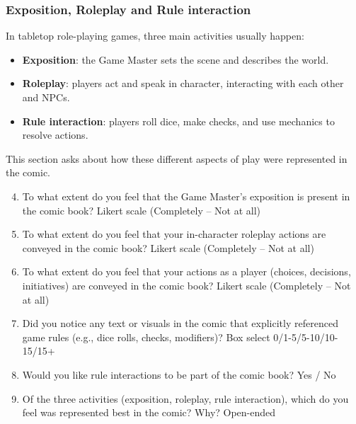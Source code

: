 \subsubsection*{Exposition, Roleplay and Rule interaction}
In tabletop role-playing games, three main activities usually happen:
\begin{itemize}
    \item \textbf{Exposition}: the Game Master sets the scene and describes the world.
    \item \textbf{Roleplay}: players act and speak in character, interacting with each other and NPCs.
    \item \textbf{Rule interaction}: players roll dice, make checks, and use mechanics to resolve actions.
\end{itemize}
This section asks about how these different aspects of play were represented in the comic.

\begin{enumerate}
    \setcounter{enumi}{3}
    \item To what extent do you feel that the Game Master’s exposition is present in the comic book? \hfill Likert scale (Completely -- Not at all)
    \item To what extent do you feel that your in-character roleplay actions are conveyed in the comic book? \hfill Likert scale (Completely -- Not at all)
    \item To what extent do you feel that your actions as a player (choices, decisions, initiatives) are conveyed in the comic book? \hfill Likert scale (Completely -- Not at all)
    \item Did you notice any text or visuals in the comic that explicitly referenced game rules (e.g., dice rolls, checks, modifiers)? \hfill Box select 0/1-5/5-10/10-15/15+
    \item Would you like rule interactions to be part of the comic book? \hfill Yes / No
    \item Of the three activities (exposition, roleplay, rule interaction), which do you feel was represented best in the comic? Why? \hfill Open-ended
\end{enumerate}

